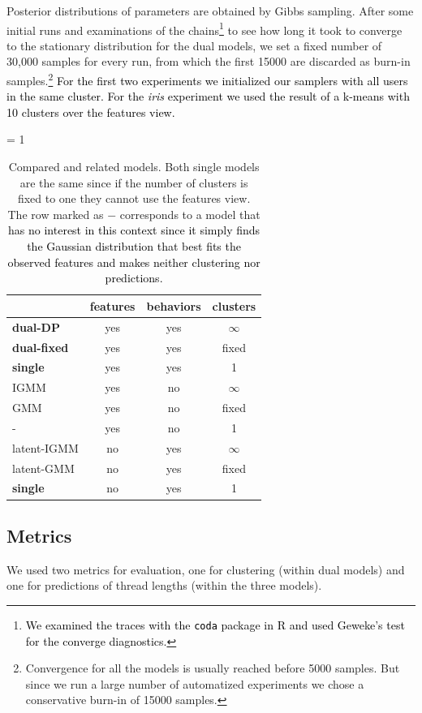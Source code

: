 \documentclass[smallextended]{svjour3}          %
\newcommand\alberto[1]{\textcolor{black}{#1}}
\begin{document}
Posterior distributions of parameters are obtained by Gibbs sampling. After some initial runs and examinations of the chains\footnote{\alberto{We examined the traces with the \texttt{coda} package in R and used Geweke's test for the converge diagnostics.}} to see how long it took to converge to the stationary distribution for the dual models, we set a fixed number of 30,000 samples for every run, from which the first 15000 are discarded as burn-in samples.\footnote{Convergence for all the models is usually reached before 5000 samples. But since we run a large number of automatized experiments we chose a conservative burn-in of 15000 samples.} 
\alberto{For the first two experiments we initialized our samplers with all users in the same cluster. For the \textit{iris} experiment we used the result of a k-means with 10 clusters over the features view.}
\begin{table}[ht]
 \begin{center}
   \tabcolsep = 1\tabcolsep
   \begin{tabular}{lccc}
   \hline\hline
                & features & behaviors & clusters\\
   \hline
   \textbf{dual-DP}    & yes & yes   & $\infty$\\
   \textbf{dual-fixed} & yes & yes   & fixed   \\
   \textbf{single}     & yes & yes   & 1 \\
   IGMM     & yes & no    & $\infty$ \\
   GMM        & yes & no    & fixed \\
   -          & yes & no    & 1 \\
   latent-IGMM & no  & yes   & $\infty$ \\
   latent-GMM    & no  & yes   & fixed \\
   \textbf{single}     & no  & yes   & 1 \\   
   \hline
   \end{tabular}
\caption{Compared and related models. Both single models are the same since if the number of clusters is fixed to one they cannot use the features view. The row marked as $-$ corresponds to a model that \alberto{has no interest in this context since it simply finds the Gaussian distribution that best fits the observed features and makes neither clustering nor predictions.}} \label{tab:models}
 \end{center}
\end{table}

\subsection{Metrics}
We used two metrics for evaluation, one for clustering (within dual models) and one for predictions of thread lengths (within the three models). 
\end{document}
